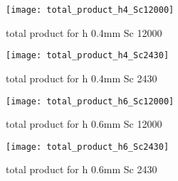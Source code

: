\documentclass[../thesis.tex]{subfiles}
\begin{document}
\begin{figure}[htbp]
	\centering
	\texttt{[image: total\_product\_h4\_Sc12000]}
	\caption{total product for h 0.4mm Sc 12000\label{fig: total_prod_h4_Sc12000}}\bigskip
	\texttt{[image: total\_product\_h4\_Sc2430]}
	\caption{total product for h 0.4mm Sc 2430\label{fig: total_prod_h4_Sc2430}}
\end{figure}

\begin{figure}[htbp]
	\centering
	\texttt{[image: total\_product\_h6\_Sc12000]}
	\caption{total product for h 0.6mm Sc 12000\label{fig: total_prod_h6_Sc12000}}\bigskip
	\texttt{[image: total\_product\_h6\_Sc2430]}
	\caption{total product for h 0.6mm Sc 2430\label{fig: total_prod_h6_Sc2430}}
\end{figure}
\end{document}
